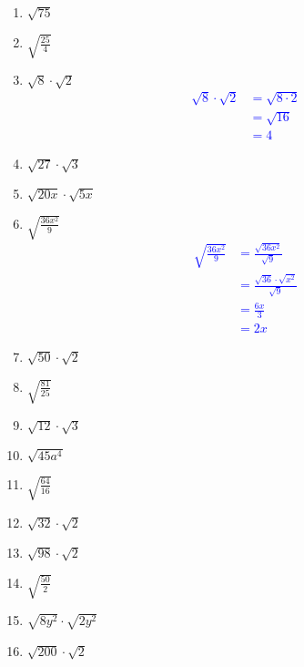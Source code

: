 \documentclass{hw}
\begin{document}
\begin{enumerate}[label=\alph*.]
    \item $\sqrt{75}$
        \studentworkspace
    \item $\sqrt{\frac{25}{4}}$
        \studentworkspace
    \item $\sqrt{8} \cdot \sqrt{2}$
        \textcolor{blue}{
        \begin{align*}
        \sqrt{8} \cdot \sqrt{2} &= \sqrt{8 \cdot 2} \\
                                &= \sqrt{16} \\
                                &= 4
        \end{align*}
        }
    \item $\sqrt{27} \cdot \sqrt{3}$
        \studentworkspace
    \item $\sqrt{20x} \cdot \sqrt{5x}$
        \studentworkspace
    \item $\sqrt{\frac{36x^2}{9}}$
        \textcolor{blue}{
        \begin{align*}
        \sqrt{\frac{36x^2}{9}} &= \frac{\sqrt{36x^2}}{\sqrt{9}} \\
                                &= \frac{\sqrt{36} \cdot \sqrt{x^2}}{\sqrt{9}} \\
                                &= \frac{6x}{3} \\
                                &= 2x
        \end{align*}
        }
    \item $\sqrt{50} \cdot \sqrt{2}$
        \studentworkspace
    \item $\sqrt{\frac{81}{25}}$
        \studentworkspace
    \item $\sqrt{12} \cdot \sqrt{3}$
        \studentxlargeworkspace
    \item $\sqrt{45a^4}$
        \studentworkspace
    \item $\sqrt{\frac{64}{16}}$
        \studentxlargeworkspace
    \item $\sqrt{32} \cdot \sqrt{2}$
        \studentworkspace
    \item $\sqrt{98} \cdot \sqrt{2}$
        \studentworkspace
    \item $\sqrt{\frac{50}{2}}$
        \studentxlargeworkspace
    \item $\sqrt{8y^2} \cdot \sqrt{2y^2}$
        \studentworkspace
    \item $\sqrt{200} \cdot \sqrt{2}$
        \studentxlargeworkspace
\end{enumerate}

\end{document}
